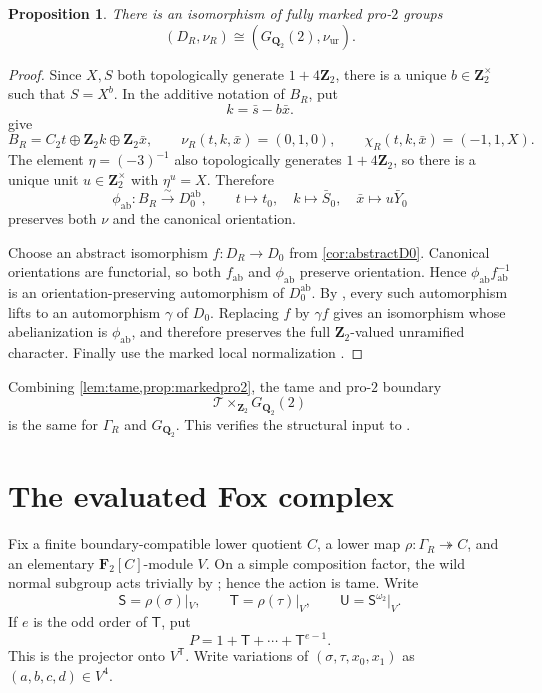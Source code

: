 \documentclass[11pt]{article}
\numberwithin{equation}{section}
\newtheorem{proposition}[theorem]{Proposition}
\theoremstyle{definition}
\theoremstyle{remark}
\newcommand{\Q}{\mathbf Q}
\newcommand{\Z}{\mathbf Z}
\newcommand{\F}{\mathbf F}
\newcommand{\GQ}{G_{\Q_2}}
\newcommand{\GQpro}{G_{\Q_2}(2)}
\newcommand{\ab}{\mathrm{ab}}
\newcommand{\ur}{\mathrm{ur}}
\newcommand{\GammaR}{\Gamma_R}
\newcommand{\TR}{\mathcal T}
\newcommand{\DR}{D_R}
\newcommand{\Dzero}{D_0}
\newcommand{\nuR}{\nu_R}
\newcommand{\chiR}{\chi_R}
\newcommand{\omegaTwo}{\omega_2}
\begin{document}
\begin{proposition}\label{prop:markedpro2}
There is an isomorphism of fully marked pro-\(2\) groups
\[
  (\DR,\nuR)\cong(\GQpro,\nu_{\ur}).
\]
\end{proposition}

\begin{proof}
Since \(X,S\) both topologically generate \(1+4\Z_2\), there is a unique
\(b\in\Z_2^\times\) such that \(S=X^b\).  In the additive notation of
\(B_R\), put
\[
  k=\bar s-b\bar x.
\]
 give
\[
  B_R=C_2t\oplus\Z_2k\oplus\Z_2\bar x,\qquad
  \nuR(t,k,\bar x)=(0,1,0),\qquad
  \chiR(t,k,\bar x)=(-1,1,X).
\]
The element \(\eta=(-3)^{-1}\) also topologically generates
\(1+4\Z_2\), so there is a unique unit \(u\in\Z_2^\times\) with
\(\eta^u=X\).  Therefore
\begin{equation}\label{eq:desiredab}
  \phi_{\ab}:B_R\xrightarrow{\sim}\Dzero^\ab,\qquad
  t\longmapsto t_0,\quad
  k\longmapsto\bar S_0,\quad
  \bar x\longmapsto u\bar Y_0
\end{equation}
preserves both \(\nu\) and the canonical orientation.

Choose an abstract isomorphism \(f:\DR\to\Dzero\) from
\cref{cor:abstractD0}.  Canonical orientations are functorial, so both
\(f_{\ab}\) and \(\phi_{\ab}\) preserve orientation.  Hence
\(\phi_{\ab}f_{\ab}^{-1}\) is an orientation-preserving automorphism of
\(\Dzero^\ab\).  By \cite[Proposition~3.9]{RT}, every such automorphism
lifts to an automorphism \(\gamma\) of \(\Dzero\).  Replacing \(f\) by
\(\gamma f\) gives an isomorphism whose abelianization is
\(\phi_{\ab}\), and therefore preserves the full \(\Z_2\)-valued
unramified character.  Finally use the marked local normalization
\cite[Proposition~1.1]{RT}.
\end{proof}

Combining \cref{lem:tame,prop:markedpro2}, the tame and pro-\(2\) boundary
\[
  \TR\times_{\Z_2}\GQpro
\]
is the same for \(\GammaR\) and \(\GQ\).  This verifies the structural input
to \cite[\S4]{RT}.

\section{The evaluated Fox complex}

Fix a finite boundary-compatible lower quotient \(C\), a lower map
\(\rho:\GammaR\twoheadrightarrow C\), and an elementary
\(\F_2[C]\)-module \(V\).  On a simple composition factor, the wild
normal subgroup acts trivially by \cite[Lemma~5.12]{RT}; hence the action is
tame.  Write
\[
  \mathsf S=\rho(\sigma)|_V,\qquad
  \mathsf T=\rho(\tau)|_V,\qquad
  \mathsf U=\mathsf S^{\omegaTwo}|_V.
\]
If \(e\) is the odd order of \(\mathsf T\), put
\[
  P=1+\mathsf T+\cdots+\mathsf T^{e-1}.
\]
This is the projector onto \(V^{\mathsf T}\).  Write variations of
\((\sigma,\tau,x_0,x_1)\) as \((a,b,c,d)\in V^4\).
\end{document}
